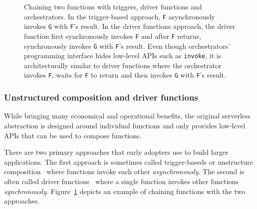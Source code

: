 \begin{figure}[t!]
    \centering
    \caption{Chaining two functions with triggers, driver
    functions and orchestrators. In the trigger-based approach, \texttt{F}
	asynchronously invokes \texttt{G} with \texttt{F}'s result. In the driver
	functions approach, the driver function first synchronously invokes
	\texttt{F} and after \texttt{F} returns, synchronously invokes \texttt{G}
	with \texttt{F}'s result. Even though orchestrators' programming interface
	hides low-level APIs such as \texttt{invoke}, it is architecturally
	similar to driver functions where the orchestrator invokes \texttt{F},
	waits for \texttt{F} to return and then invokes \texttt{G} with
	\texttt{F}'s result.}
    \label{fig:chain-example}
\end{figure}

\subsubsection{Unstructured composition and driver functions}

While bringing many economical and operational benefits, the original
serverless abstraction is designed around individual functions and only
provides low-level APIs that can be used to compose functions.

There are two primary approaches that early adopters use to build larger
applications. The first approach is sometimes called trigger-baseds or
unstructure composition~\cite{netherite} where functions invoke each other
\emph{asynchronously}. The second is often called driver
functions~\cite{beldi} where a single function invokes other functions
\emph{synchronously}. Figure~\ref{fig:chain-example} depicts an example of
chaining functions with the two approaches.

